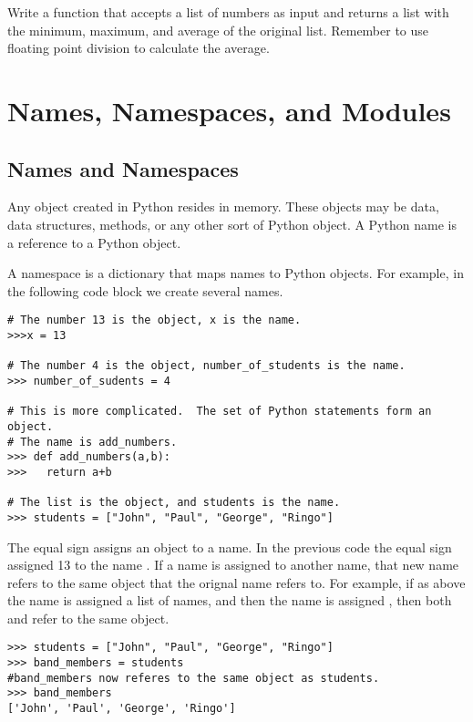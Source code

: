\begin{problem}
Write a function that accepts a list of numbers as input and returns a list with the minimum, maximum, and average of the original list.
Remember to use floating point division to calculate the average.
\end{problem}

\section*{Names, Namespaces, and Modules}

\subsection*{Names and Namespaces}
Any object created in Python resides in memory.
These objects may be data, data structures, methods, or any other sort of Python object.
A Python name is a reference to a Python object.

A namespace is a dictionary that maps names to Python objects.
For example, in the following code block we create several names.

\begin{lstlisting}
# The number 13 is the object, x is the name.
>>>x = 13

# The number 4 is the object, number_of_students is the name.
>>> number_of_sudents = 4

# This is more complicated.  The set of Python statements form an object.  
# The name is add_numbers.
>>> def add_numbers(a,b):
>>>   return a+b

# The list is the object, and students is the name.
>>> students = ["John", "Paul", "George", "Ringo"]
\end{lstlisting}

The equal sign assigns an object to a name.
In the previous code the equal sign assigned 13 to the name .
If a name is assigned to another name, that new name refers to the same object that the orignal name refers to.
For example, if as above the name  is assigned a list of names, and then the name  is assigned , then both  and  refer to the same object.

\begin{lstlisting}
>>> students = ["John", "Paul", "George", "Ringo"]
>>> band_members = students
#band_members now referes to the same object as students.
>>> band_members
['John', 'Paul', 'George', 'Ringo']
\end{lstlisting}

